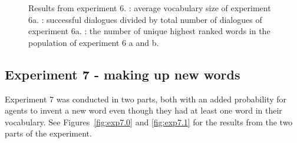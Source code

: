 \begin{figure}
    \centering
    \ContinuedFloat
    \hfill
    \par \bigskip
    \caption{Results from experiment 6. : average vocabulary size of experiment 6a. : successful dialogues divided by total number of dialogues of experiment 6a. : the number of unique highest ranked words in the population of experiment 6 a and b.}
    \label{fig:exp6.1}
\end{figure}

\clearpage
\subsection{Experiment 7 - making up new words}
Experiment 7 was conducted in two parts, both with an added probability for agents to invent a new word even though they had at least one word in their vocabulary. See Figures~\ref{fig:exp7.0} and \ref{fig:exp7.1} for the results from the two parts of the experiment.

